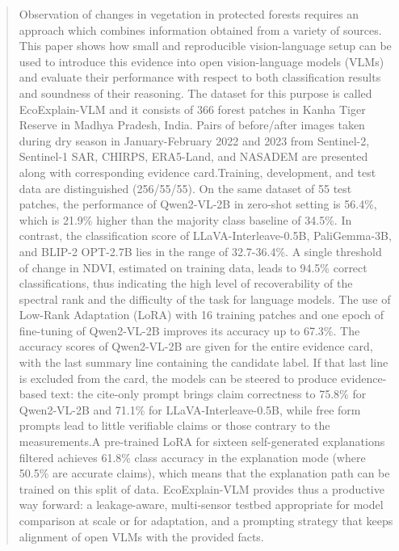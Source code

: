 
\begin{abstract}
Observation of changes in vegetation in protected forests requires an approach which combines information obtained from a variety of sources. This paper shows how small and reproducible vision-language setup can be used to introduce this evidence into open vision-language models (VLMs) and evaluate their performance with respect to both classification results and soundness of their reasoning. The dataset for this purpose is called EcoExplain-VLM and it consists of 366 forest patches in Kanha Tiger Reserve in Madhya Pradesh, India. Pairs of before/after images taken during dry season in January-February 2022 and 2023 from Sentinel-2, Sentinel-1 SAR, CHIRPS, ERA5-Land, and NASADEM are presented along with corresponding evidence card.Training, development, and test data are distinguished (256/55/55). On the same dataset of 55 test patches, the performance of Qwen2-VL-2B in zero-shot setting is 56.4\%, which is 21.9\% higher than the majority class baseline of 34.5\%. In contrast, the classification score of LLaVA-Interleave-0.5B, PaliGemma-3B, and BLIP-2 OPT-2.7B lies in the range of 32.7-36.4\%. A single threshold of change in NDVI, estimated on training data, leads to 94.5\% correct classifications, thus indicating the high level of recoverability of the spectral rank and the difficulty of the task for language models. The use of Low-Rank Adaptation (LoRA) with 16 training patches and one epoch of fine-tuning of Qwen2-VL-2B improves its accuracy up to 67.3\%. The accuracy scores of Qwen2-VL-2B are given for the entire evidence card, with the last summary line containing the candidate label. If that last line is excluded from the card, the models can be steered to produce evidence-based text: the cite-only prompt brings claim correctness to 75.8\% for Qwen2-VL-2B and 71.1\% for LLaVA-Interleave-0.5B, while free form prompts lead to little verifiable claims or those contrary to the measurements.A pre-trained LoRA for sixteen self-generated explanations filtered achieves 61.8\% class accuracy in the explanation mode (where 50.5\% are accurate claims), which means that the explanation path can be trained on this split of data. EcoExplain-VLM provides thus a productive way forward: a leakage-aware, multi-sensor testbed appropriate for model comparison at scale or for adaptation, and a prompting strategy that keeps alignment of open VLMs with the provided facts.
\end{abstract}

